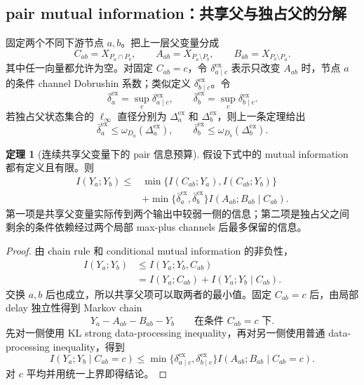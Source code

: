 \documentclass[a4paper,11pt]{article}
\theoremstyle{definition}
\newtheorem{theorem}{定理}
\newcommand{\1}{\mathbf 1}
\begin{document}
\subsection{pair mutual information：共享父与独占父的分解}

固定两个不同下游节点 $a,b$。把上一层父变量分成
\[
C_{ab}=X_{P_a\cap P_b},\qquad
A_{ab}=X_{P_a\setminus P_b},\qquad
B_{ab}=X_{P_b\setminus P_a}.
\]
其中任一向量都允许为空。对固定 $C_{ab}=c$，令
$\delta_{a\mid c}^{\mathrm{ex}}$ 表示只改变 $A_{ab}$ 时，节点 $a$ 的条件
channel Dobrushin 系数；类似定义
$\delta_{b\mid c}^{\mathrm{ex}}$。令
\[
\bar\delta_a^{\mathrm{ex}}
=
\sup_c\delta_{a\mid c}^{\mathrm{ex}},
\qquad
\bar\delta_b^{\mathrm{ex}}
=
\sup_c\delta_{b\mid c}^{\mathrm{ex}}.
\]
若独占父状态集合的 $\ell_\infty$ 直径分别为
$\Delta_a^{\mathrm{ex}}$ 和 $\Delta_b^{\mathrm{ex}}$，则上一条定理给出
\[
\bar\delta_a^{\mathrm{ex}}
\le\omega_{D_a}(\Delta_a^{\mathrm{ex}}),
\qquad
\bar\delta_b^{\mathrm{ex}}
\le\omega_{D_b}(\Delta_b^{\mathrm{ex}}).
\]

\begin{theorem}[连续共享父变量下的 pair 信息预算]
\label{thm:pair}
假设下式中的 mutual information 都有定义且有限。则
\[
\begin{aligned}
I(Y_a;Y_b)
\le{}&
\min\{I(C_{ab};Y_a),I(C_{ab};Y_b)\}\\
&+
\min\{\bar\delta_a^{\mathrm{ex}},
       \bar\delta_b^{\mathrm{ex}}\}
I(A_{ab};B_{ab}\mid C_{ab}).
\end{aligned}
\]
第一项是共享父变量实际传到两个输出中较弱一侧的信息；第二项是独占父之间
剩余的条件依赖经过两个局部 max-plus channels 后最多保留的信息。
\end{theorem}

\begin{proof}
由 chain rule 和 conditional mutual information 的非负性，
\[
\begin{aligned}
I(Y_a;Y_b)
&\le I(Y_a;Y_b,C_{ab})\\
&=I(Y_a;C_{ab})+I(Y_a;Y_b\mid C_{ab}).
\end{aligned}
\]
交换 $a,b$ 后也成立，所以共享父项可以取两者的最小值。固定
$C_{ab}=c$ 后，由局部 delay 独立性得到 Markov chain
\[
Y_a-A_{ab}-B_{ab}-Y_b
\qquad\text{在条件 }C_{ab}=c\text{ 下}.
\]
先对一侧使用 KL strong data-processing inequality，再对另一侧使用普通
data-processing inequality，得到
\[
I(Y_a;Y_b\mid C_{ab}=c)
\le
\min\{\delta_{a\mid c}^{\mathrm{ex}},
       \delta_{b\mid c}^{\mathrm{ex}}\}
I(A_{ab};B_{ab}\mid C_{ab}=c).
\]
对 $c$ 平均并用统一上界即得结论。
\end{proof}
\end{document}
